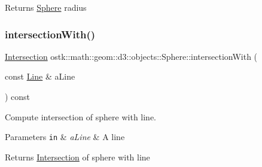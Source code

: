 \begin{DoxyReturn}{Returns}
\hyperlink{classostk_1_1math_1_1geom_1_1d3_1_1objects_1_1_sphere}{Sphere} radius 
\end{DoxyReturn}
\mbox{\label{classostk_1_1math_1_1geom_1_1d3_1_1objects_1_1_sphere_afbae10b116900f5383913e564c0ec91a}} 
\subsubsection{\texorpdfstring{intersection\+With()}{intersectionWith()}\hspace{0.1cm}{\footnotesize\ttfamily [1/5]}}
{\footnotesize\ttfamily \hyperlink{classostk_1_1math_1_1geom_1_1d3_1_1_intersection}{Intersection} ostk\+::math\+::geom\+::d3\+::objects\+::\+Sphere\+::intersection\+With (\begin{DoxyParamCaption}\item[{const \hyperlink{classostk_1_1math_1_1geom_1_1d3_1_1objects_1_1_line}{Line} \&}]{a\+Line }\end{DoxyParamCaption}) const}



Compute intersection of sphere with line. 


\begin{DoxyParams}[1]{Parameters}
\mbox{\tt in}  & {\em a\+Line} & A line \\
\hline
\end{DoxyParams}
\begin{DoxyReturn}{Returns}
\hyperlink{classostk_1_1math_1_1geom_1_1d3_1_1_intersection}{Intersection} of sphere with line 
\end{DoxyReturn}
\mbox{\label{classostk_1_1math_1_1geom_1_1d3_1_1objects_1_1_sphere_a204e67d24679bed63ab54cafda683918}} 
